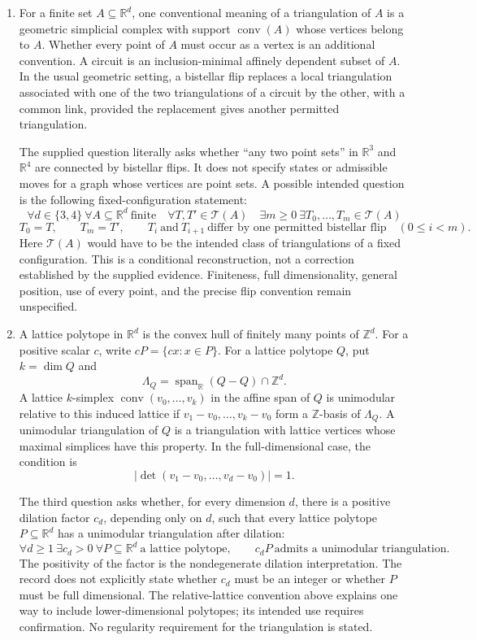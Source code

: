 \documentclass[11pt]{article}
\newcommand{\Z}{\mathbb{Z}}
\newcommand{\R}{\mathbb{R}}
\begin{document}
\begin{enumerate}
\item For a finite set \(A\subseteq\R^d\), one conventional meaning of a triangulation of \(A\) is a geometric simplicial complex with support \(\operatorname{conv}(A)\) whose vertices belong to \(A\). Whether every point of \(A\) must occur as a vertex is an additional convention. A circuit is an inclusion-minimal affinely dependent subset of \(A\). In the usual geometric setting, a bistellar flip replaces a local triangulation associated with one of the two triangulations of a circuit by the other, with a common link, provided the replacement gives another permitted triangulation.

The supplied question literally asks whether ``any two point sets'' in \(\R^3\) and \(\R^4\) are connected by bistellar flips. It does not specify states or admissible moves for a graph whose vertices are point sets. A possible intended question is the following fixed-configuration statement:
\[
\forall d\in\{3,4\}\ \forall A\subseteq\R^d\ \text{finite}\quad
\forall T,T'\in\mathcal T(A)\quad
\exists m\geq0\ \exists T_0,\ldots,T_m\in\mathcal T(A)
\]
\[
T_0=T,\qquad T_m=T',\qquad
T_i\ \text{and}\ T_{i+1}\ \text{differ by one permitted bistellar flip}
\quad(0\leq i<m).
\]
Here \(\mathcal T(A)\) would have to be the intended class of triangulations of a fixed configuration. This is a conditional reconstruction, not a correction established by the supplied evidence. Finiteness, full dimensionality, general position, use of every point, and the precise flip convention remain unspecified.

\item A lattice polytope in \(\R^d\) is the convex hull of finitely many points of \(\Z^d\). For a positive scalar \(c\), write \(cP=\{cx:x\in P\}\). For a lattice polytope \(Q\), put \(k=\dim Q\) and
\[
\Lambda_Q=\operatorname{span}_{\R}(Q-Q)\cap\Z^d.
\]
A lattice \(k\)-simplex \(\operatorname{conv}(v_0,\ldots,v_k)\) in the affine span of \(Q\) is unimodular relative to this induced lattice if \(v_1-v_0,\ldots,v_k-v_0\) form a \(\Z\)-basis of \(\Lambda_Q\). A unimodular triangulation of \(Q\) is a triangulation with lattice vertices whose maximal simplices have this property. In the full-dimensional case, the condition is
\[
\left|\det(v_1-v_0,\ldots,v_d-v_0)\right|=1.
\]

The third question asks whether, for every dimension \(d\), there is a positive dilation factor \(c_d\), depending only on \(d\), such that every lattice polytope \(P\subseteq\R^d\) has a unimodular triangulation after dilation:
\[
\forall d\geq1\ \exists c_d>0\ \forall P\subseteq\R^d\ \text{a lattice polytope},
\qquad c_dP\ \text{admits a unimodular triangulation}.
\]
The positivity of the factor is the nondegenerate dilation interpretation. The record does not explicitly state whether \(c_d\) must be an integer or whether \(P\) must be full dimensional. The relative-lattice convention above explains one way to include lower-dimensional polytopes; its intended use requires confirmation. No regularity requirement for the triangulation is stated.
\end{enumerate}
\end{document}
